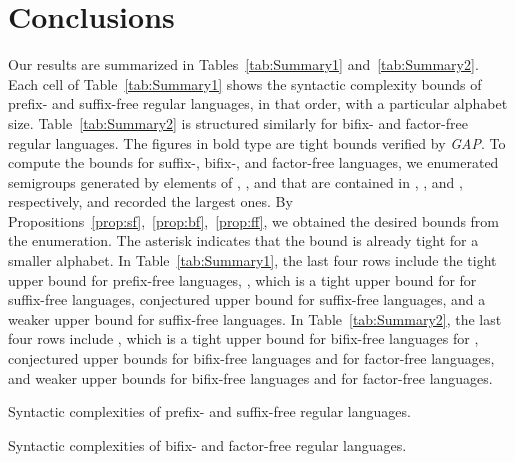 \documentclass{llncs}
\begin{document}
\section{Conclusions}\label{sec:cl}

Our results are summarized in Tables~\ref{tab:Summary1} and~\ref{tab:Summary2}. Each cell of Table~\ref{tab:Summary1} shows the syntactic complexity bounds of prefix- and suffix-free regular languages, in that order, with a particular alphabet size. Table~\ref{tab:Summary2} is structured similarly for bifix- and factor-free regular languages. The figures in bold type are tight bounds verified by {\it GAP}. To compute the bounds for suffix-, bifix-, and factor-free languages, we enumerated semigroups generated by elements of , , and  that are contained in , , and , respectively, and recorded the largest ones. By Propositions~\ref{prop:sf},~\ref{prop:bf},~\ref{prop:ff}, we obtained the desired bounds from the enumeration. The asterisk  indicates that the bound is already tight for a smaller alphabet. In Table~\ref{tab:Summary1}, the last four rows include the tight upper bound  for prefix-free languages, , which is a tight upper bound for  for suffix-free languages, conjectured upper bound  for suffix-free languages, and a weaker upper bound  for suffix-free languages. In Table~\ref{tab:Summary2}, the last four rows include , which is a tight upper bound for bifix-free languages for , conjectured upper bounds  for bifix-free languages and  for factor-free languages, and weaker upper bounds  for bifix-free languages and  for factor-free languages. 
\vspace{-.4cm}


\begin{table}[H]
\caption{Syntactic complexities of prefix- and suffix-free regular languages.}
\label{tab:Summary1}
\begin{center}

\end{center}
\label{table1}
\end{table}

\vspace{-1.4cm}

\begin{table}[H]
\caption{Syntactic complexities of bifix- and factor-free regular languages.}
\label{tab:Summary2}
\begin{center}

\end{center}
\label{table2}
\end{table}
\end{document}
